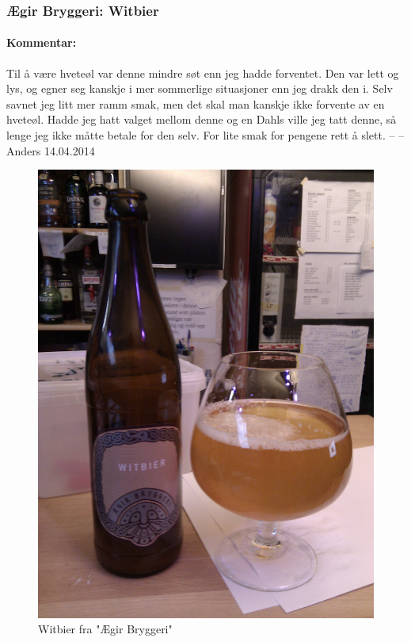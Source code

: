 \documentclass[12pt,a4paper,oneside,norsk]{article}
\begin{document}
\subsubsection{Ægir Bryggeri: Witbier}
\paragraph{Kommentar:} Til å være hveteøl var denne mindre søt enn jeg hadde forventet. Den var lett og lys, og egner seg kanskje i mer sommerlige situasjoner enn jeg drakk den i. Selv savnet jeg litt mer ramm smak, men det skal man kanskje ikke forvente av en hveteøl. Hadde jeg hatt valget mellom denne og en Dahls ville jeg tatt denne, så lenge jeg ikke måtte betale for den selv. For lite smak for pengene rett å slett.
\newline
-- -- Anders 14.04.2014

\begin{figure} [H]
\centering
\includegraphics[scale=0.1, angle=0]{Bilder/Ol/EgirBryggeriWitbier.jpg}
\caption{Witbier fra "Ægir Bryggeri"}
\end{figure}
\end{document}

